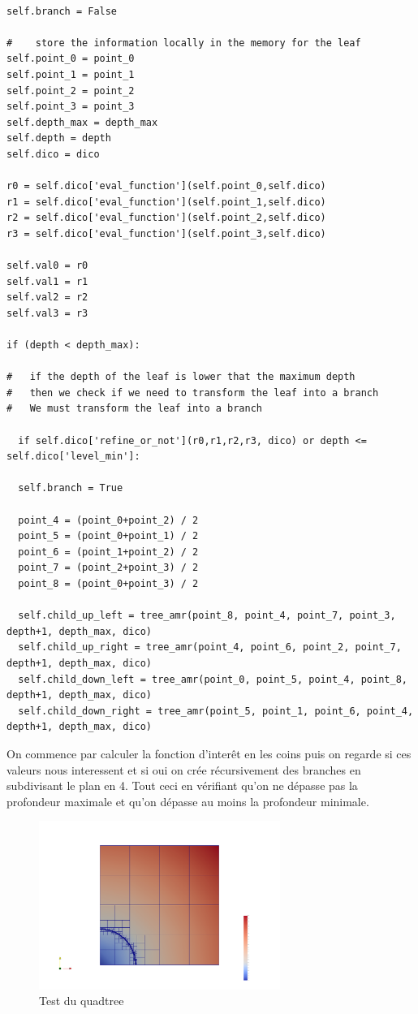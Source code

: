\documentclass[french]{article}
\begin{document}
\begin{verbatim}

self.branch = False

#    store the information locally in the memory for the leaf 
self.point_0 = point_0
self.point_1 = point_1
self.point_2 = point_2
self.point_3 = point_3
self.depth_max = depth_max
self.depth = depth
self.dico = dico

r0 = self.dico['eval_function'](self.point_0,self.dico)
r1 = self.dico['eval_function'](self.point_1,self.dico)
r2 = self.dico['eval_function'](self.point_2,self.dico)
r3 = self.dico['eval_function'](self.point_3,self.dico)

self.val0 = r0
self.val1 = r1
self.val2 = r2
self.val3 = r3

if (depth < depth_max):

#   if the depth of the leaf is lower that the maximum depth 
#   then we check if we need to transform the leaf into a branch
#   We must transform the leaf into a branch 

  if self.dico['refine_or_not'](r0,r1,r2,r3, dico) or depth <= self.dico['level_min']:

  self.branch = True

  point_4 = (point_0+point_2) / 2
  point_5 = (point_0+point_1) / 2
  point_6 = (point_1+point_2) / 2
  point_7 = (point_2+point_3) / 2
  point_8 = (point_0+point_3) / 2

  self.child_up_left = tree_amr(point_8, point_4, point_7, point_3, depth+1, depth_max, dico)
  self.child_up_right = tree_amr(point_4, point_6, point_2, point_7, depth+1, depth_max, dico)
  self.child_down_left = tree_amr(point_0, point_5, point_4, point_8, depth+1, depth_max, dico)
  self.child_down_right = tree_amr(point_5, point_1, point_6, point_4, depth+1, depth_max, dico)

\end{verbatim}

On commence par calculer la fonction d'interêt en les coins puis on regarde si ces valeurs nous interessent
et si oui on crée récursivement des branches en subdivisant le plan en 4. Tout ceci en vérifiant qu'on ne
dépasse pas la profondeur maximale et qu'on dépasse au moins la profondeur minimale.

\begin{figure}[h]
	\centering
	\includegraphics[width=0.7\textwidth]{Figures/Quadtree.png}
	\caption{Test du quadtree}
\end{figure}
\end{document}
